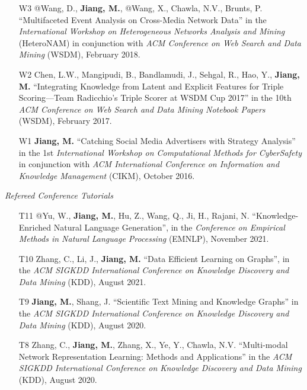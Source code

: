 \documentclass[10pt]{article}
\newenvironment{myindentpar}[1]%
{\begin{list}{}%
         {\setlength{\leftmargin}{#1}}%
         \item[]%
}
{\end{list}}
\newcounter{list}
\begin{document}
\begin{myindentpar}{0.00cm}
\begin{enumerate}[leftmargin=.5cm]
\item[W3] @Wang, D., \textbf{Jiang, M.}, @Wang, X., Chawla, N.V., Brunts, P. ``Multifaceted Event Analysis on Cross-Media Network Data'' in the \textit{International Workshop on Heterogeneous Networks Analysis and Mining} (HeteroNAM) in conjunction with \textit{ACM Conference on Web Search and Data Mining} (WSDM), February 2018.

\item[W2] Chen, L.W., Mangipudi, B., Bandlamudi, J., Sehgal, R., Hao, Y., \textbf{Jiang, M.} ``Integrating Knowledge from Latent and Explicit Features for Triple Scoring—Team Radicchio's Triple Scorer at WSDM Cup 2017'' in the 10th \textit{ACM Conference on Web Search and Data Mining Notebook Papers} (WSDM), February 2017.

\item[W1] \textbf{Jiang, M.} ``Catching Social Media Advertisers with Strategy Analysis'' in the 1st \textit{International Workshop on Computational Methods for CyberSafety} in conjunction with \textit{ACM International Conference on Information and Knowledge Management} (CIKM), October 2016.

\end{enumerate}

\hspace{-0.25cm}\textit{Refereed Conference Tutorials}

\begin{enumerate}[leftmargin=.5cm]

\item[T11] @Yu, W., \textbf{Jiang, M.}, Hu, Z., Wang, Q., Ji, H., Rajani, N. ``Knowledge-Enriched Natural Language Generation'', in the \textit{Conference on Empirical Methods in Natural Language Processing} (EMNLP), November 2021.

\item[T10] Zhang, C., Li, J., \textbf{Jiang, M.} ``Data Efficient Learning on Graphs'', in the \textit{ACM SIGKDD International Conference on Knowledge Discovery and Data Mining} (KDD), August 2021.
		
\item[T9] \textbf{Jiang, M.}, Shang, J. ``Scientific Text Mining and Knowledge Graphs'' in the \textit{ACM SIGKDD International Conference on Knowledge Discovery and Data Mining} (KDD), August 2020.
		
\item[T8] Zhang, C., \textbf{Jiang, M.}, Zhang, X., Ye, Y., Chawla, N.V. ``Multi-modal Network Representation Learning: Methods and Applications'' in the \textit{ACM SIGKDD International Conference on Knowledge Discovery and Data Mining} (KDD), August 2020.


\end{enumerate}
\end{myindentpar}
\end{document}
